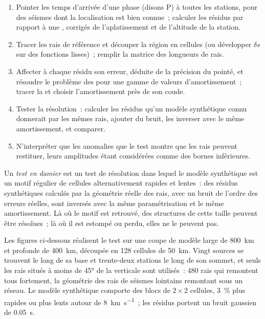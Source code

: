 \begin{method}\label{met:b3:seismology-imaging:tomo}
\begin{enumerate}
  \item Pointer les temps d'arrivée d'une phase (disons P) à toutes les stations, pour
        des séismes dont la localisation est bien connue~; calculer les résidus
        par rapport à une , corrigés de l'aplatissement et de
        l'altitude de la station.
  \item Tracer les rais de référence et découper la région en cellules (ou développer
        $\delta s$ sur des fonctions lisses)~; remplir la matrice des longueurs de rais.
  \item Affecter à chaque résidu son erreur, déduite de la précision du pointé, et résoudre
        le problème des  pour une gamme de valeurs d'amortissement~;
        tracer la  et choisir l'amortissement près de son coude.
  \item Tester la résolution~: calculer les résidus qu'un modèle synthétique connu
        donnerait par les mêmes rais, ajouter du bruit, les inverser avec le même
        amortissement, et comparer.
  \item N'interpréter que les anomalies que le test montre que les rais peuvent
        restituer, leurs amplitudes étant considérées comme des bornes inférieures.
\end{enumerate}
\end{method}

\begin{definition}\label{def:b3:seismology-imaging:checkerboard}
Un \emph{test en damier} est un test de résolution dans
lequel le modèle synthétique est un motif régulier de cellules alternativement rapides
et lentes~: des résidus synthétiques calculés par la géométrie réelle des rais, avec un bruit
de l'ordre des erreurs réelles, sont inversés avec la même paramétrisation et le même
amortissement. Là où le motif est retrouvé, des structures de cette taille peuvent être
résolues~; là où il est estompé ou perdu, elles ne le peuvent pas.
\end{definition}

Les figures ci-dessous réalisent le test sur une coupe de modèle large de
\qty{800}{km} et profonde de \qty{400}{km}, découpée en 128 cellules de \qty{50}{km}. Vingt
sources se trouvent le long de sa base et trente-deux stations le long de son sommet, et seuls
les rais situés à moins de \ang{45} de la verticale sont utilisés~: 480 rais qui remontent tous
fortement, la géométrie des rais de séismes lointains remontant sous un réseau. Le modèle
synthétique comporte des blocs de $2\times2$ cellules, \qty{3}{\percent} plus rapides ou
plus lents autour de \qty{8}{km.s^{-1}}~; les résidus portent un bruit gaussien de
\qty{0.05}{s}.

